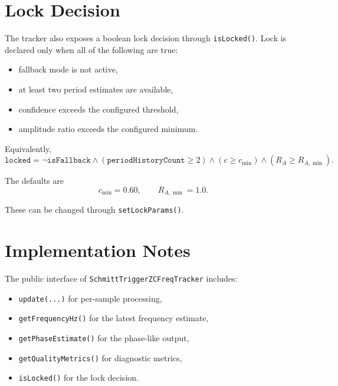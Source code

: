\documentclass[conference]{IEEEtran}
\begin{document}
    \section{Lock Decision}

    The tracker also exposes a boolean lock decision through \texttt{isLocked()}.
    Lock is declared only when all of the following are true:
    \begin{itemize}[leftmargin=1.4em]
        \item fallback mode is not active,
        \item at least two period estimates are available,
        \item confidence exceeds the configured threshold,
        \item amplitude ratio exceeds the configured minimum.
    \end{itemize}

    Equivalently,
    \begin{equation}
        \texttt{locked}
        =
        \neg\texttt{isFallback}
        \land
        (\texttt{periodHistoryCount}\ge 2)
        \land
        (c \ge c_{\min})
        \land
        (R_A \ge R_{A,\min}).
    \end{equation}

    The defaults are
    \begin{equation}
        c_{\min} = 0.60,
        \qquad
        R_{A,\min} = 1.0.
    \end{equation}

    These can be changed through \texttt{setLockParams()}.

    \section{Implementation Notes}

    The public interface of \texttt{SchmittTriggerZCFreqTracker} includes:
    \begin{itemize}[leftmargin=1.4em]
        \item \texttt{update(...)} for per-sample processing,
        \item \texttt{getFrequencyHz()} for the latest frequency estimate,
        \item \texttt{getPhaseEstimate()} for the phase-like output,
        \item \texttt{getQualityMetrics()} for diagnostic metrics,
        \item \texttt{isLocked()} for the lock decision.
    \end{itemize}
\end{document}
